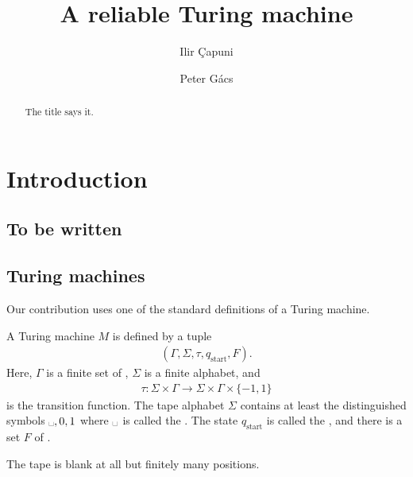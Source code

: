 \documentclass[12pt]{memoir}
\newcommand{\blank}{\text{\textvisiblespace}}
\newcommand{\start}{\mathrm{start}}
\begin{document}
\title{A reliable Turing machine}

\author{Ilir \c{C}apuni \and Peter G\'acs}

\maketitle

\begin{abstract}
The title says it.
\end{abstract}

\tableofcontents*

\section{Introduction}

\subsection{To be written}

\subsection{Turing machines}\label{sec:TM}

Our contribution uses one of the standard definitions of a Turing
machine.

    A Turing machine \( M \) is defined by a tuple
        \begin{align*}
             (\Gamma, \Sigma,\tau, q_{\start},F).
        \end{align*}
    Here, \( \Gamma \) is a finite set of ,
    \( \Sigma \) is a finite alphabet, and
        \begin{align*}
             \tau\colon\Sigma\times \Gamma\to \Sigma\times\Gamma\times\{-1,1\}
        \end{align*}
    is the transition function.
The tape alphabet \( \Sigma \) contains at least the distinguished
symbols \( \blank,0,1 \) where \( \blank \) is called the .
The state \( q_{\start} \) is called the , and
there is a set \( F \) of .

    The tape is blank at all but finitely many positions.
\end{document}
